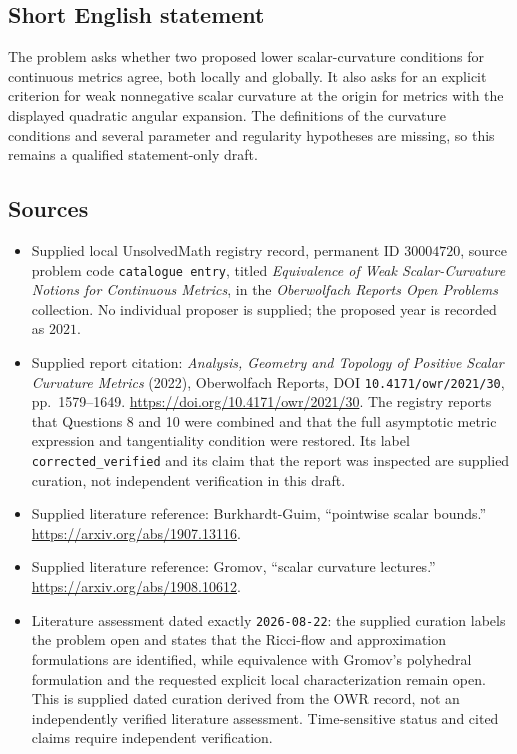 \documentclass[11pt]{article}
\begin{document}
\subsection{Short English statement}
The problem asks whether two proposed lower scalar-curvature conditions for continuous metrics agree, both locally and globally. It also asks for an explicit criterion for weak nonnegative scalar curvature at the origin for metrics with the displayed quadratic angular expansion. The definitions of the curvature conditions and several parameter and regularity hypotheses are missing, so this remains a qualified statement-only draft.
\subsection{Sources}
\begin{itemize}
\item Supplied local UnsolvedMath registry record, permanent ID \(30004720\), source problem code \texttt{catalogue entry}, titled \emph{Equivalence of Weak Scalar-Curvature Notions for Continuous Metrics}, in the \emph{Oberwolfach Reports Open Problems} collection. No individual proposer is supplied; the proposed year is recorded as \(2021\).
\item Supplied report citation: \emph{Analysis, Geometry and Topology of Positive Scalar Curvature Metrics} (2022), Oberwolfach Reports, DOI \texttt{10.4171/owr/2021/30}, pp.\ 1579--1649. \url{https://doi.org/10.4171/owr/2021/30}. The registry reports that Questions 8 and 10 were combined and that the full asymptotic metric expression and tangentiality condition were restored. Its label \texttt{corrected\_verified} and its claim that the report was inspected are supplied curation, not independent verification in this draft.
\item Supplied literature reference: Burkhardt-Guim, ``pointwise scalar bounds.'' \url{https://arxiv.org/abs/1907.13116}.
\item Supplied literature reference: Gromov, ``scalar curvature lectures.'' \url{https://arxiv.org/abs/1908.10612}.
\item Literature assessment dated exactly \texttt{2026-08-22}: the supplied curation labels the problem open and states that the Ricci-flow and approximation formulations are identified, while equivalence with Gromov's polyhedral formulation and the requested explicit local characterization remain open. This is supplied dated curation derived from the OWR record, not an independently verified literature assessment. Time-sensitive status and cited claims require independent verification.
\end{itemize}
\end{document}

